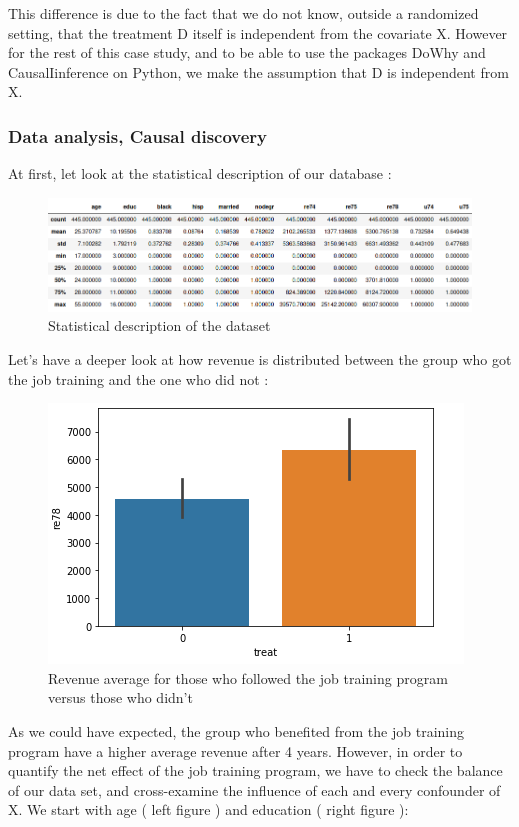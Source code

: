 \documentclass{article}
\begin{document}
This difference is due to the fact that we do not know, outside a randomized setting, that the treatment D itself is independent from the covariate X. 
However for the rest of this case study, and to be able to use the packages DoWhy and CausalIinference on Python, we make the assumption that D is independent from X.

\subsubsection{Data analysis, Causal discovery}

At first, let look at the statistical description of our database : 

\begin{figure}[h]
\centering
\includegraphics[width=1 \textwidth]{../figures/data_description.png}
\caption{Statistical description of the dataset}
\end{figure}


Let's have a deeper look at how revenue is distributed between the group who got the job training and the one who did not : 

\begin{figure}[h]
\small
\centering
\includegraphics[width=0.5 \textwidth]{../figures/treatment_average_2.png}
\caption{Revenue average for those who followed the job training program versus those who didn't}
\end{figure}


As we could have expected, the group who benefited from the job training program have a higher average revenue after 4 years. However, in order to quantify the net effect of the job training program, we have to check the balance of our data set, and cross-examine the influence of each and every confounder of X.
We start with age ( left figure ) and education ( right figure ):
\end{document}
